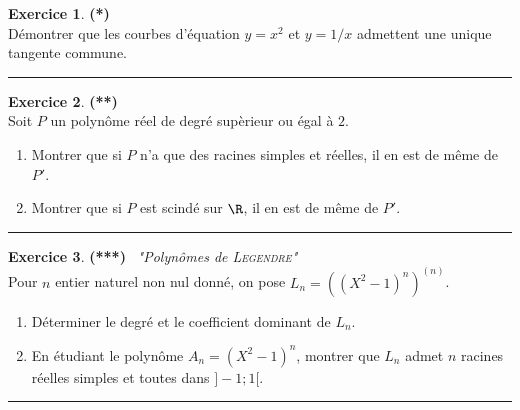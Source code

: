 \documentclass[a4paper,11pt]{article}
\theoremstyle{definition}
\newtheorem{exo}{Exercice} %
\begin{document}
\newpage


\begin{minipage}{1\linewidth}
	\begin{minipage}[t]{0.48\linewidth}
		\raggedright
		
				\begin{exo}\textbf{(*)}\quad\\[0.2cm]
			Démontrer que les courbes d'équation $y=x^2$ et $y=1/x$ admettent une unique tangente commune.
			
			\centering
			\rule{1\linewidth}{0.6pt}
		\end{exo}
		
			\begin{exo}\textbf{(**)}\quad\\[0.2cm]
			Soit $P$ un polynôme réel de degré supèrieur ou égal à $2$.
			\begin{enumerate}
				\item  Montrer que si $P$ n'a que des racines simples et réelles, il en est de même de $P'$.
				\item  Montrer que si $P$ est scindé sur $\R$, il en est de même de $P'$.
			\end{enumerate}
			
			\centering
			\rule{1\linewidth}{0.6pt}
		\end{exo}
		
		
		\begin{exo}\textbf{(***)} \ \textit{"Polynômes de \textsc{Legendre}"}\quad\\[0.2cm]
			Pour $n$ entier naturel non nul donné, on pose $L_n=((X^2-1)^n)^{(n)}$.
			\begin{enumerate}
				\item  Déterminer le degré et le coefficient dominant de $L_n$.
				\item  En étudiant le polynôme $A_n=(X^2-1)^n$, montrer que $L_n$ admet $n$ racines réelles simples et toutes dans $]-1;1[$.
			\end{enumerate}
			
			\centering
			\rule{1\linewidth}{0.6pt}
		\end{exo}
		
		

		
		
		
	\end{minipage}	
	\hfill\vrule\hfill
	\begin{minipage}[t]{0.48\linewidth}
		\raggedright
		

		
		

\end{minipage}
\end{minipage}
\end{document}
